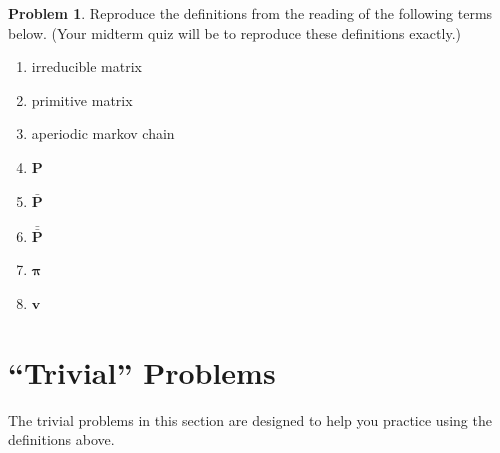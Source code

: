 \documentclass[10pt]{article}
\theoremstyle{definition}
\newtheorem{problem}{Problem}
\newcommand{\p}{\mathbf P}
\newcommand{\pb}{\bar {\p}}
\newcommand{\pbb}{\bar {\pb}}
\newcommand{\pr}{\bm \pi}
\begin{document}
\newpage
\begin{problem}
    Reproduce the definitions from the reading of the following terms below.
    (Your midterm quiz will be to reproduce these definitions exactly.)
    \begin{enumerate}
        \item irreducible matrix
            \vspace{2in}
        \item primitive matrix
            \vspace{2in}
        \item aperiodic markov chain
            \vspace{2in}
        \item $\p$
            \vspace{2in}
        \item $\pb$
            \vspace{2in}
        \item $\pbb$
            \vspace{2in}
        \item $\pr$
            \vspace{2in}
        \item $\mathbf v$ %
            \vspace{2in}
    \end{enumerate}
\end{problem}


%

\newpage
\section{``Trivial'' Problems}
The trivial problems in this section are designed to help you practice using the definitions above.
\end{document}
